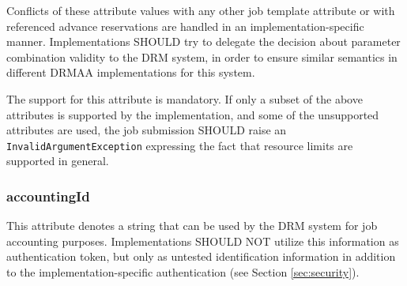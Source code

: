 \documentclass{article}
\newcommand{\h}[1]{\lstinline|#1|}
\newcommand{\rat}[1]{}
\begin{document}
\rat{
\enquote{Pipe size} was not added, since there is no use case in DRM systems with a job concept. \enquote{Max user processes} was omitted because it operates on the notion of users, which is not an explicit concept in DRMAA.

The understanding of wall clock time and CPU time was decided in the Apr 6th and 13th 2011 and June 29th 2011 conf call. Condor and Grid Engine also add SUSPEND time to wall-clock time, but LSF does not.}

Conflicts of these attribute values with any other job template attribute or with referenced advance reservations are handled in an implementation-specific manner. Implementations SHOULD try to delegate the decision about parameter combination validity to the DRM system, in order to ensure similar semantics in different DRMAA implementations for this system.

The support for this attribute is mandatory. If only a subset of the above attributes is supported by the implementation, and some of the unsupported attributes are used, the job submission SHOULD raise an \h{InvalidArgumentException} expressing the fact that resource limits are supported in general.

\rat{
In comparison to DRMAA 1.0, resource usage limitations can now be expressed by two dictionaries and an according standardized set of valid dictionary keys. The idea is to allow a direct mapping to ulimit(3) semantics, which are supported by the majority of DRM system today. A separate run duration limit is no longer needed, since this is covered by the new CPU\_TIME limit parameter. (conf. call Jun 9th 2010).

This distinguishing between different reactions on limit violation was restricted to the job entering, or not entering, the FAILED state. All further effects (e.g., no more \emph{open()} calls possible) are out of scope for DRMAA, since they relate to operating system behavior on  execution host (conf call May 4th 2011).

The attribute is mandatory, since the missing general support for resource limits can be simply expressed by raising InvalidArgumentException for all types.
}

\subsubsection{accountingId}

This attribute denotes a string that can be used by the DRM system for job accounting purposes. Implementations SHOULD NOT utilize this information as authentication token, but only as untested identification information in addition to the implementation-specific authentication (see Section \ref{sec:security}).
\end{document}
